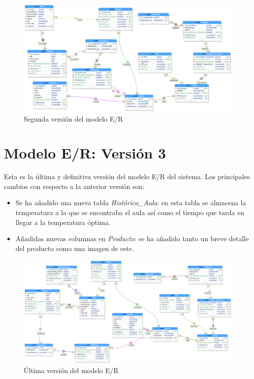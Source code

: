 \documentclass[12pt]{report}
\begin{document}
\begin{figure}[H]
    \centering
    \includegraphics[scale = 0.4]{imagenes//base_de_datos/ImagenBD2.png}
    \caption{Segunda versión del modelo E/R}
    \label{fig:Figura3.4.2}
\end{figure}

\section{Modelo E/R: Versión 3}
Esta es la última y definitiva versión del modelo E/R del sistema. Los principales cambios con respecto a la anterior versión son:
\begin{itemize}
    \item Se ha añadido una nueva tabla \textit{Histórico\_Aula}: en esta tabla se almacena la temperatura a la que se encontraba el aula así como el tiempo que tarda en llegar a la temperatura óptima.
    \item Añadidas nuevas columnas en \textit{Producto}: se ha añadido tanto un breve detalle del producto como una imagen de este.
\end{itemize} 

\begin{figure}[H]
    \centering
    \includegraphics[scale = 0.35]{imagenes//base_de_datos/ImagenBD3.png}
    \caption{Última versión del modelo E/R}
    \label{fig:Figura3.4.3}
\end{figure}
\end{document}
